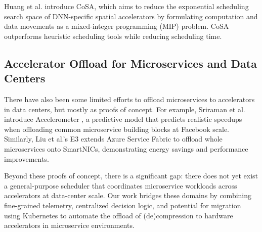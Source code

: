 Huang et al. \cite{huangCoSAScheduling2021} introduce CoSA, which aims to reduce the exponential scheduling search space of DNN-specific spatial accelerators by formulating computation and data movements as a mixed-integer programming (MIP) problem.
CoSA outperforms heuristic scheduling tools while reducing scheduling time.

\subsection{Accelerator Offload for Microservices and Data Centers}

There have also been some limited efforts to offload microservices to accelerators in data centers, but mostly as proofs of concept.
For example, Sriraman et al. introduce Accelerometer \cite{sriramanAccelerometerUnderstanding2020}, a predictive model that predicts realistic speedups when offloading common microservice building blocks at Facebook scale.
Similarly, Liu et al.'s E3 \cite{liuE3EnergyEfficient2019} extends Azure Service Fabric to offload whole microservices onto SmartNICs, demonstrating energy savings and performance improvements.

Beyond these proofs of concept, there is a significant gap: there does not yet exist a general-purpose scheduler that coordinates microservice workloads across accelerators at data-center scale.
Our work bridges these domains by combining fine-grained telemetry, centralized decision logic, and potential for migration using Kubernetes to automate the offload of (de)compression to hardware accelerators in microservice environments.
